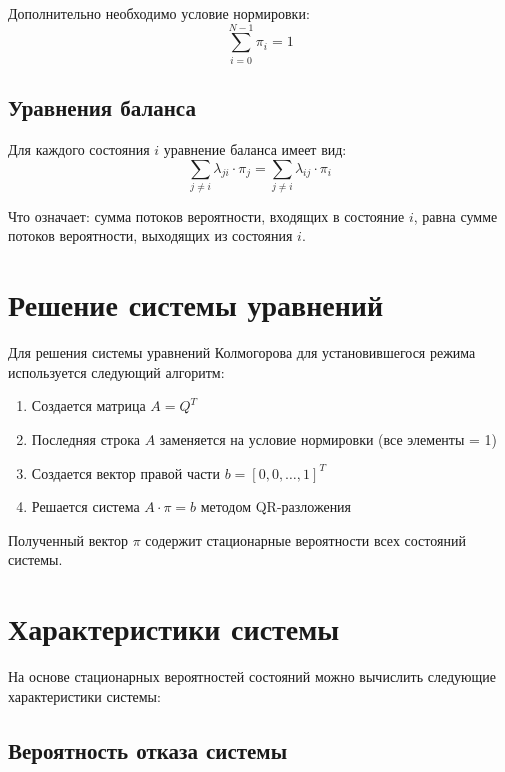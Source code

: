 \documentclass[12pt,a4paper]{article}
\begin{document}
Дополнительно необходимо условие нормировки:
\begin{equation}
    \sum_{i=0}^{N-1} \pi_i = 1
\end{equation}

\subsection{Уравнения баланса}

Для каждого состояния $i$ уравнение баланса имеет вид:
\begin{equation}
    \sum_{j \neq i} \lambda_{ji} \cdot \pi_j = \sum_{j \neq i} \lambda_{ij} \cdot \pi_i
\end{equation}

Что означает: сумма потоков вероятности, входящих в состояние $i$, равна сумме потоков вероятности, выходящих из состояния $i$.

\section{Решение системы уравнений}

Для решения системы уравнений Колмогорова для установившегося режима используется следующий алгоритм:

\begin{enumerate}
    \item Создается матрица $A = Q^T$
    \item Последняя строка $A$ заменяется на условие нормировки (все элементы = 1)
    \item Создается вектор правой части $b = [0, 0, \ldots, 1]^T$
    \item Решается система $A \cdot \pi = b$ методом QR-разложения
\end{enumerate}

Полученный вектор $\pi$ содержит стационарные вероятности всех состояний системы.

\section{Характеристики системы}

На основе стационарных вероятностей состояний можно вычислить следующие характеристики системы:

\subsection{Вероятность отказа системы}
\end{document}
